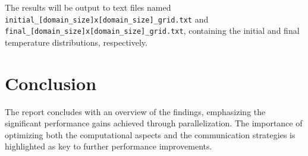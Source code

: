 \documentclass[11pt]{article}
\begin{document}
        The results will be output to text files named \texttt{initial\_[domain\_size]x[domain\_size]\_grid.txt} and \texttt{final\_[domain\_size]x[domain\_size]\_grid.txt}, containing the initial and final temperature distributions, respectively.

    \section{Conclusion}
        The report concludes with an overview of the findings, emphasizing the significant performance gains achieved through parallelization. The importance of optimizing both the computational aspects and the communication strategies is highlighted as key to further performance improvements.
\end{document}
